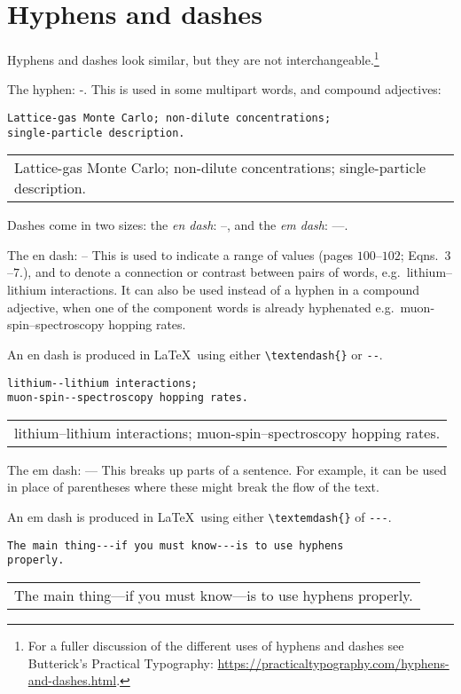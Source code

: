 \documentclass[a4paper]{tufte-handout}
\begin{document}
\section{Hyphens and dashes}
Hyphens and dashes look similar, but they are not interchangeable.\footnote{For a fuller discussion of the different uses of hyphens and dashes see Butterick's Practical Typography: \url{https://practicaltypography.com/hyphens-and-dashes.html}.}

The hyphen: -. This is used in some multipart words, and compound adjectives:
\begin{lstlisting}
Lattice-gas Monte Carlo; non-dilute concentrations; 
single-particle description.
\end{lstlisting}
\begin{tabular}{|p{10cm}}
Lattice-gas Monte Carlo; non-dilute concentrations; 
single-particle description.
\end{tabular}


Dashes come in two sizes: the \emph{en dash}: --, and the \emph{em dash}: ---.

The en dash: -- This is used to indicate a range of values (pages $100$--$102$; Eqns.~$3$--$7$.), and to denote a connection or contrast between pairs of words, e.g.\ lithium--lithium interactions. It can also be used instead of a hyphen in a compound adjective, when one of the component words is already hyphenated e.g.\ muon-spin--spectroscopy hopping rates.

An en dash is produced in \LaTeX\ using either \lstinline$\textendash{}$ or \lstinline{--}.
\begin{lstlisting}
lithium--lithium interactions; 
muon-spin--spectroscopy hopping rates.
\end{lstlisting}
\begin{tabular}{|p{10cm}}
lithium--lithium interactions; 
muon-spin--spectroscopy hopping rates.
\end{tabular}

The em dash: --- This breaks up parts of a sentence. For example, it can be used in place of parentheses where these might break the flow of the text.

An em dash is produced in \LaTeX\ using either \lstinline$\textemdash{}$ of \lstinline{---}.
 \begin{lstlisting}
The main thing---if you must know---is to use hyphens
properly.
\end{lstlisting}
\begin{tabular}{|p{10cm}}
The main thing---if you must know---is to use hyphens
properly.
\end{tabular}
\end{document}
